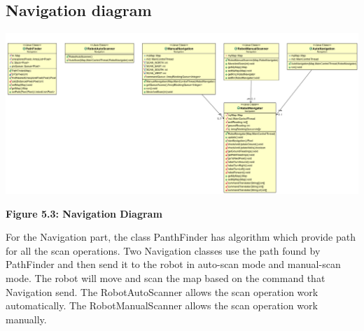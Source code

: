 \documentclass[11pt, a4paper]{report}
\begin{document}
\subsection{Navigation diagram}
 \begin{center}
 \includegraphics[width=18.20cm]{Navigation.png}
\end{center}
\begin{center}
\textbf {Figure 5.3: Navigation Diagram} \\[0.3cm]
\end{center}
For the Navigation part, the class PanthFinder has algorithm which provide path for all the scan operations. Two Navigation classes use the path found by PathFinder and then send it to the robot in auto-scan mode and manual-scan mode. The robot will move and scan the map based on the command that Navigation send. The RobotAutoScanner allows the scan operation work automatically. The RobotManualScanner allows the scan operation work manually.
\pagebreak
\end{document}
